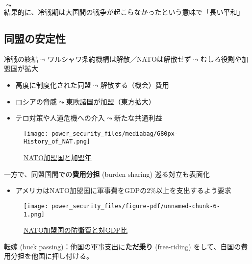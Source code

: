 \documentclass[
  xelatex,
  ja=standard]{bxjsarticle}
\providecommand{\tightlist}{%
  \setlength{\itemsep}{0pt}\setlength{\parskip}{0pt}}\usepackage{longtable,booktabs,array}
\begin{document}
\(\leadsto\)結果的に、冷戦期は大国間の戦争が起こらなかったという意味で「長い平和」\citep{gaddis1986}

\hypertarget{ux540cux76dfux306eux5b89ux5b9aux6027}{%
\subsection{同盟の安定性}\label{ux540cux76dfux306eux5b89ux5b9aux6027}}

冷戦の終結\(\leadsto\)ワルシャワ条約機構は解散／NATOは解散せず\(\leadsto\)むしろ役割や加盟国が拡大

\begin{itemize}
\tightlist
\item
  高度に制度化された同盟\(\leadsto\)解散する（機会）費用
\item
  ロシアの脅威\(\leadsto\)東欧諸国が加盟（東方拡大）
\item
  テロ対策や人道危機への介入\(\leadsto\)新たな共通利益
\end{itemize}

\begin{figure}[htpb]

{\centering \texttt{[image: power\_security\_files/mediabag/680px-History\_of\_NAT.png]}

}

\caption{\href{https://commons.wikimedia.org/wiki/File:History_of_NATO_enlargement.svg}{NATO加盟国と加盟年}}

\end{figure}

一方で、同盟国間での\textbf{費用分担} (burden sharing) 巡る対立も表面化

\begin{itemize}
\tightlist
\item
  アメリカはNATO加盟国に軍事費をGDPの2\%以上を支出するよう要求
\end{itemize}

\begin{figure}[htpb]

{\centering \texttt{[image: power\_security\_files/figure-pdf/unnamed-chunk-6-1.png]}

}

\caption{\href{https://www.nato.int/cps/en/natohq/news_197050.htm}{NATO加盟国の防衛費と対GDP比}}

\end{figure}

転嫁 (buck passing)：他国の軍事支出に\textbf{ただ乗り} (free-riding)
をして、自国の費用分担を他国に押し付ける。
\end{document}

